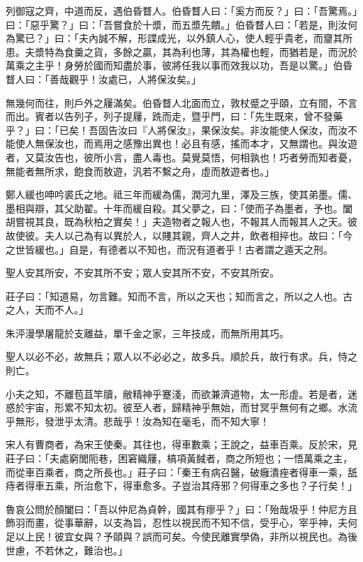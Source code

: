 
\begin{pinyinscope}
列御寇之齊，中道而反，遇伯昏瞀人。伯昏瞀人曰：「奚方而反？」曰：「吾驚焉。」曰：「惡乎驚？」曰：「吾嘗食於十漿，而五漿先饋。」伯昏瞀人曰：「若是，則汝何為驚已？」曰：「夫內誠不解，形諜成光，以外鎮人心，使人輕乎貴老，而齏其所患。夫漿特為食羹之貨，多餘之贏，其為利也薄，其為權也輕，而猶若是，而況於萬乘之主乎！身勞於國而知盡於事，彼將任我以事而效我以功，吾是以驚。」伯昏瞀人曰：「善哉觀乎！汝處已，人將保汝矣。」

無幾何而往，則戶外之屨滿矣。伯昏瞀人北面而立，敦杖蹙之乎頤，立有間，不言而出。賓者以告列子，列子提屨，跣而走，暨乎門，曰：「先生既來，曾不發藥乎？」曰：「已矣！吾固告汝曰『人將保汝』，果保汝矣。非汝能使人保汝，而汝不能使人無保汝也，而焉用之感豫出異也！必且有感，搖而本才，又無謂也。與汝遊者，又莫汝告也，彼所小言，盡人毒也。莫覺莫悟，何相孰也！巧者勞而知者憂，無能者無所求，飽食而敖遊，汎若不繫之舟，虛而敖遊者也。」

鄭人緩也呻吟裘氏之地。祗三年而緩為儒，潤河九里，澤及三族，使其弟墨。儒、墨相與辯，其父助翟。十年而緩自殺。其父夢之，曰：「使而子為墨者，予也。闔胡嘗視其良，既為秋柏之實矣！」夫造物者之報人也，不報其人而報其人之天。彼故使彼。夫人以己為有以異於人，以賤其親，齊人之井，飲者相捽也。故曰：「今之世皆緩也。」自是，有德者以不知也，而況有道者乎！古者謂之遁天之刑。

聖人安其所安，不安其所不安；眾人安其所不安，不安其所安。

莊子曰：「知道易，勿言難。知而不言，所以之天也；知而言之，所以之人也。古之人，天而不人。」

朱泙漫學屠龍於支離益，單千金之家，三年技成，而無所用其巧。

聖人以必不必，故無兵；眾人以不必必之，故多兵。順於兵，故行有求。兵，恃之則亡。

小夫之知，不離苞苴竿牘，敝精神乎蹇淺，而欲兼濟道物，太一形虛。若是者，迷惑於宇宙，形累不知太初。彼至人者，歸精神乎無始，而甘冥乎無何有之鄉。水流乎無形，發泄乎太清。悲哉乎！汝為知在毫毛，而不知大寧！

宋人有曹商者，為宋王使秦。其往也，得車數乘；王說之，益車百乘。反於宋，見莊子曰：「夫處窮閭阨巷，困窘織屨，槁項黃馘者，商之所短也；一悟萬乘之主，而從車百乘者，商之所長也。」莊子曰：「秦王有病召醫，破癰潰痤者得車一乘，舐痔者得車五乘，所治愈下，得車愈多。子豈治其痔邪？何得車之多也？子行矣！」

魯哀公問於顏闔曰：「吾以仲尼為貞幹，國其有瘳乎？」曰：「殆哉圾乎！仲尼方且飾羽而畫，從事華辭，以支為旨，忍性以視民而不知不信，受乎心，宰乎神，夫何足以上民！彼宜女與？予頤與？誤而可矣。今使民離實學偽，非所以視民也。為後世慮，不若休之，難治也。」


\end{pinyinscope}
